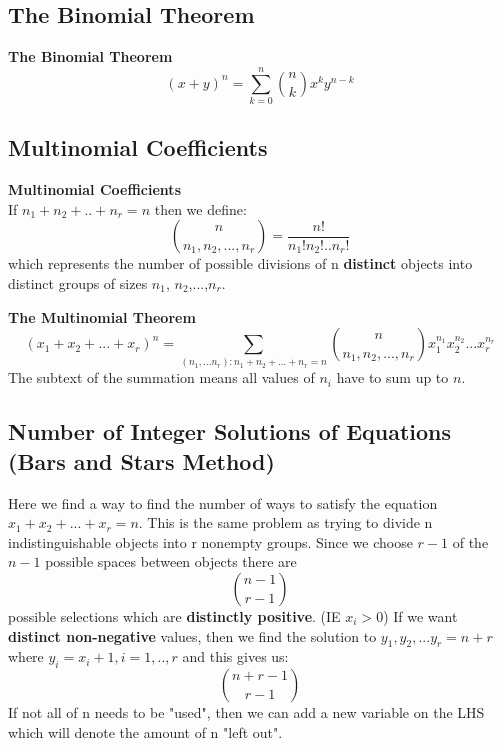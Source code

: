 \documentclass[10pt,a4paper]{article}
\begin{document}
           \subsection{The Binomial Theorem}
           \begin{framed}
               \center\textbf{The Binomial Theorem}
               $$(x+y)^n = \sum_{k=0}^{n}\binom{n}{k}x^ky^{n-k}$$
           \end{framed}
           
           \subsection{Multinomial Coefficients}
           \begin{framed}
               \center\textbf{Multinomial Coefficients} \\
               If $n_1 + n_2 + .. + n_r = n$ then we define: $$\binom{n}{n_1,n_2,...,n_r} = \frac{n!}{n_1!n_2!..n_r!}$$ which represents the number of possible divisions of n \textbf{distinct} objects into distinct groups of sizes $n_1$, $n_2$,...,$n_r$.
           \end{framed}
          \begin{framed}
          \center\textbf{The Multinomial Theorem}
          $$(x_1 + x_2 + ... + x_r)^n = \sum_{(n_1,...n_r):n_1+n_2+...+n_r = n}\binom{n}{n_1,n_2,...,n_r}x_1^{n_1}x_2^{n_2}...x_r^{n_r}$$
          The subtext of the summation means all values of $n_{i}$ have to sum up to $n$.
          \end{framed}
          \newpage
          \subsection{Number of Integer Solutions of Equations \\ (Bars and Stars Method)}
          Here we find a way to find the number of ways to satisfy the equation \\ $x_1 + x_2 + ... + x_r = n$. This is the same problem as trying to divide n indistinguishable objects into r nonempty groups. Since we choose $r-1$ of the $n-1$ possible spaces between objects there are $$\binom{n-1}{r-1} $$ possible selections which are \textbf{distinctly positive}. (IE $x_i > 0$) 
          If we want \textbf{distinct non-negative} values, then we find the solution to $y_1, y_2, ... y_r = n + r$ where $y_i = x_i + 1, i = 1,..,r$ and this gives us: $$ \binom{n+r-1}{r-1}$$
          If not all of n needs to be "used", then we can add a new variable on the LHS which will denote the amount of n "left out". 
\end{document}
